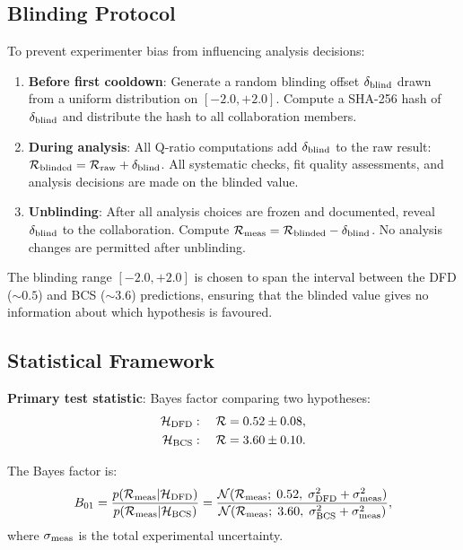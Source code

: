 \documentclass[11pt]{article}
\newcommand{\Rq}{\mathcal{R}}
\begin{document}
\subsection{Blinding Protocol}

To prevent experimenter bias from influencing analysis decisions:

\begin{enumerate}[nosep]
\item \textbf{Before first cooldown}: Generate a random blinding offset
  $\delta_{\rm blind}$ drawn from a uniform distribution on $[-2.0, +2.0]$.
  Compute a SHA-256 hash of $\delta_{\rm blind}$ and distribute the
  hash to all collaboration members.

\item \textbf{During analysis}: All Q-ratio computations add
  $\delta_{\rm blind}$ to the raw result:
  $\Rq_{\rm blinded} = \Rq_{\rm raw} + \delta_{\rm blind}$.
  All systematic checks, fit quality assessments, and analysis
  decisions are made on the blinded value.

\item \textbf{Unblinding}: After all analysis choices are frozen and
  documented, reveal $\delta_{\rm blind}$ to the collaboration.
  Compute $\Rq_{\rm meas} = \Rq_{\rm blinded} - \delta_{\rm blind}$.
  No analysis changes are permitted after unblinding.
\end{enumerate}

The blinding range $[-2.0, +2.0]$ is chosen to span the interval
between the DFD ($\sim 0.5$) and BCS ($\sim 3.6$) predictions,
ensuring that the blinded value gives no information about which
hypothesis is favoured.

\subsection{Statistical Framework}

\textbf{Primary test statistic}: Bayes factor comparing two hypotheses:
\begin{align}
\mathcal{H}_{\rm DFD}&: \quad \Rq = 0.52 \pm 0.08, \\
\mathcal{H}_{\rm BCS}&: \quad \Rq = 3.60 \pm 0.10.
\end{align}

The Bayes factor is:
\begin{equation}
B_{01} = \frac{p(\Rq_{\rm meas} | \mathcal{H}_{\rm DFD})}
{p(\Rq_{\rm meas} | \mathcal{H}_{\rm BCS})}
= \frac{\mathcal{N}(\Rq_{\rm meas};\; 0.52,\; \sigma_{\rm DFD}^2 +
\sigma_{\rm meas}^2)}
{\mathcal{N}(\Rq_{\rm meas};\; 3.60,\; \sigma_{\rm BCS}^2 +
\sigma_{\rm meas}^2)},
\end{equation}
where $\sigma_{\rm meas}$ is the total experimental uncertainty.
\end{document}
